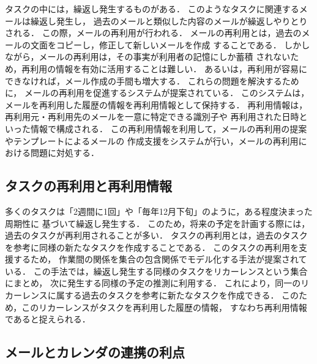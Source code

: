 \documentclass[submit,techreq,noauthor,dvipdfmx]{ipsj}
\begin{document}
タスクの中には，繰返し発生するものがある．
このようなタスクに関連するメールは繰返し発生し，
過去のメールと類似した内容のメールが繰返しやりとりされる．
この際，メールの再利用が行われる．
メールの再利用とは，過去のメールの文面をコピーし，修正して新しいメールを作成
することである．
%
%
%
%
%
しかしながら，メールの再利用は，その事実が利用者の記憶にしか蓄積
されないため，再利用の情報を有効に活用することは難しい．
あるいは，再利用が容易にできなければ，メール作成の手間も増大する．
これらの問題を解決するために，
メールの再利用を促進するシステムが提案されている\cite{kimuray2014a}．
このシステムは，メールを再利用した履歴の情報を再利用情報として保持する．
再利用情報は，再利用元・再利用先のメールを一意に特定できる識別子や
再利用された日時といった情報で構成される．
この再利用情報を利用して，メールの再利用の提案やテンプレートによるメールの
作成支援をシステムが行い，メールの再利用における問題に対処する．

\subsection{タスクの再利用と再利用情報}\label{sec:task_reuse}

多くのタスクは「2週間に1回」や「毎年12月下旬」のように，ある程度決まった周期性に
基づいて繰返し発生する\cite{mihara2011a}．
このため，将来の予定を計画する際には，過去のタスクが再利用されることが多い．
タスクの再利用とは，過去のタスクを参考に同様の新たなタスクを作成することである．
このタスクの再利用を支援するため，
作業間の関係を集合の包含関係でモデル化する手法が提案されている\cite{mihara2013a}．
この手法では，繰返し発生する同様のタスクをリカーレンスという集合にまとめ，
次に発生する同様の予定の推測に利用する．
これにより，同一のリカーレンスに属する過去のタスクを参考に新たなタスクを作成できる．
このため，このリカーレンスがタスクを再利用した履歴の情報，
すなわち再利用情報であると捉えられる．

\subsection{メールとカレンダの連携の利点}\label{sec:merit_of_cooperation}
\end{document}
